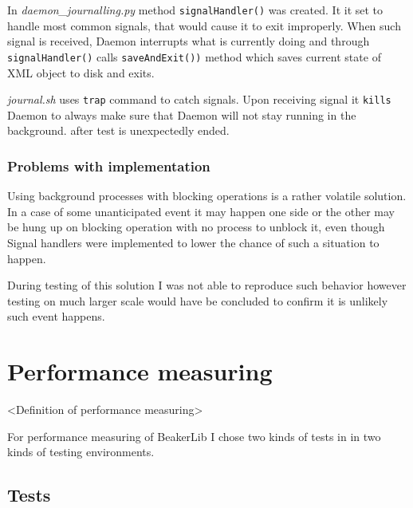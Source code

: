 In \textit{daemon\_journalling.py} method \texttt{signalHandler()} was created. It it set to handle most common signals, that would cause it to exit improperly. When such signal is received, Daemon interrupts what is currently doing and through \texttt{signalHandler()} calls \texttt{saveAndExit())} method which saves current state of XML object to disk and exits.

\textit{journal.sh} uses \texttt{trap} command to catch signals. Upon receiving signal it \texttt{kills} Daemon to always make sure that Daemon will not stay running in the background. after test is unexpectedly ended.  

\subsection{Problems with implementation}
Using background processes with blocking operations is a rather volatile solution. In a case of some unanticipated event it may happen one side or the other may be hung up on blocking operation with no process to unblock it, even though Signal handlers were implemented to lower the chance of such a situation to happen.

During testing of this solution I was not able to reproduce such behavior however testing on much larger scale would have be concluded to confirm it is unlikely such event happens.



\chapter{Performance measuring}
\label{performance}
<Definition of performance measuring>

For performance measuring of BeakerLib I chose two kinds of tests in in two kinds of testing environments.

\section{Tests}

